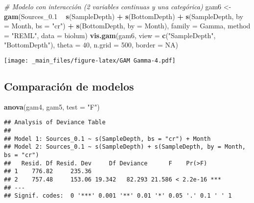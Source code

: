 \documentclass[
]{book}
\newenvironment{Shaded}{\begin{snugshade}}{\end{snugshade}}
\newcommand{\CommentTok}[1]{\textcolor[rgb]{0.56,0.35,0.01}{\textit{#1}}}
\newcommand{\DataTypeTok}[1]{\textcolor[rgb]{0.13,0.29,0.53}{#1}}
\newcommand{\DecValTok}[1]{\textcolor[rgb]{0.00,0.00,0.81}{#1}}
\newcommand{\FloatTok}[1]{\textcolor[rgb]{0.00,0.00,0.81}{#1}}
\newcommand{\KeywordTok}[1]{\textcolor[rgb]{0.13,0.29,0.53}{\textbf{#1}}}
\newcommand{\NormalTok}[1]{#1}
\newcommand{\OperatorTok}[1]{\textcolor[rgb]{0.81,0.36,0.00}{\textbf{#1}}}
\newcommand{\OtherTok}[1]{\textcolor[rgb]{0.56,0.35,0.01}{#1}}
\newcommand{\StringTok}[1]{\textcolor[rgb]{0.31,0.60,0.02}{#1}}
\begin{document}
\begin{Shaded}
\begin{Highlighting}[]
\CommentTok{# Modelo con interacción (2 variables continuas y una categórica)}
\NormalTok{gam6 <-}\StringTok{ }\KeywordTok{gam}\NormalTok{(Sources_}\FloatTok{0.1} \OperatorTok{~}\StringTok{ }\KeywordTok{s}\NormalTok{(SampleDepth) }\OperatorTok{+}\StringTok{ }\KeywordTok{s}\NormalTok{(BottomDepth) }\OperatorTok{+}\StringTok{ }\KeywordTok{s}\NormalTok{(SampleDepth, }\DataTypeTok{by =}\NormalTok{ Month, }\DataTypeTok{bs =} \StringTok{"cr"}\NormalTok{) }\OperatorTok{+}\StringTok{ }\KeywordTok{s}\NormalTok{(BottomDepth, }\DataTypeTok{by =}\NormalTok{ Month), }\DataTypeTok{family =}\NormalTok{ Gamma, }\DataTypeTok{method =} \StringTok{"REML"}\NormalTok{, }\DataTypeTok{data =}\NormalTok{ biolum)}
\KeywordTok{vis.gam}\NormalTok{(gam6, }\DataTypeTok{view =} \KeywordTok{c}\NormalTok{(}\StringTok{"SampleDepth"}\NormalTok{, }\StringTok{"BottomDepth"}\NormalTok{), }\DataTypeTok{theta =} \DecValTok{40}\NormalTok{, }\DataTypeTok{n.grid =} \DecValTok{500}\NormalTok{, }\DataTypeTok{border =} \OtherTok{NA}\NormalTok{)}
\end{Highlighting}
\end{Shaded}

\texttt{[image: \_main\_files/figure-latex/GAM Gamma-4.pdf]}

\hypertarget{comparaciuxf3n-de-modelos}{%
\subsection{Comparación de modelos}\label{comparaciuxf3n-de-modelos}}

\begin{Shaded}
\begin{Highlighting}[]
\KeywordTok{anova}\NormalTok{(gam4, gam5, }\DataTypeTok{test =} \StringTok{"F"}\NormalTok{)}
\end{Highlighting}
\end{Shaded}

\begin{verbatim}
## Analysis of Deviance Table
## 
## Model 1: Sources_0.1 ~ s(SampleDepth, bs = "cr") + Month
## Model 2: Sources_0.1 ~ s(SampleDepth) + s(SampleDepth, by = Month, bs = "cr")
##   Resid. Df Resid. Dev     Df Deviance      F    Pr(>F)    
## 1    776.82     235.36                                     
## 2    757.48     153.06 19.342   82.293 21.586 < 2.2e-16 ***
## ---
## Signif. codes:  0 '***' 0.001 '**' 0.01 '*' 0.05 '.' 0.1 ' ' 1
\end{verbatim}
\end{document}
